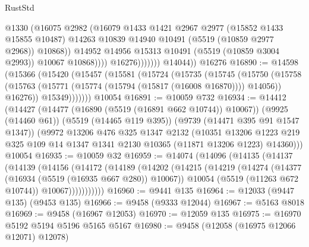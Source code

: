 \begin{lexlean}{RustStd}
\begin{coremodule}
                              @1330
                              (@16075
                                @2982
                                (@16079
                                  @1433
                                  @1421
                                  @2967
                                  @2977
                                  (@15852 @1433 @15855 @10487)
                                  @14263
                                  @10839
                                  @14940
                                  @10491
                                  (@5519 (@10859 @2977 @2968))
                                  @10868))
                              @14952
                              @14956
                              @15313
                              @10491
                              (@5519 (@10859 @3004 @2993))
                              @10067
                              @10868))))
                      @16276)))))))
        @14044))
    @16276
@16890 := @14598
    (@15366
      (@15420
        (@15457
          (@15581
            (@15724
              (@15735
                (@15745
                  (@15750
                    (@15758
                      (@15763 (@15771 (@15774 (@15794 (@15817 (@16008 @16870)))) @14056))
                      @16276))
                  @15349)))))))
    @10054
@16891 := @10059 @732
@16934 := @14412
    (@14427
      (@14477 (@16890 (@5519 (@16891 @662 @10744)) @10067))
      (@9925 (@14460 @61))
      (@5519 (@14465 @119 @395))
      (@9739 (@14471 @395 @91 @1547 @1347))
      (@9972
        @13206
        @476
        @325
        @1347
        @2132
        (@10351
          @13206
          @1223
          @219
          @325
          @109
          @14
          @1347
          @1341
          @2130
          @10365
          (@11871 @13206 @1223)
          @14360)))
    @10054
@16935 := @10059 @32
@16959 := @14074
    (@14096
      (@14135
        (@14137
          (@14139
            (@14156
              (@14172
                (@14189
                  (@14202
                    (@14215
                      (@14219
                        (@14274
                          (@14377 (@16934 (@5519 (@16935 @667 @280)) @10067))
                          @10054
                          (@5519 (@11263 @672 @10744))
                          @10067)))))))))))
@16960 := @9441 @135
@16964 := @12033 (@9447 @135) (@9453 @135)
@16966 := @9458 (@9333 @12044)
@16967 := @5163 @8018
@16969 := @9458 (@16967 @12053)
@16970 := @12059 @135
@16975 := @16970 @5192 @5194 @5196 @5165 @5167
@16980 := @9458 (@12058 (@16975 @12066 @12071) @12078)

\end{coremodule}
\end{lexlean}
